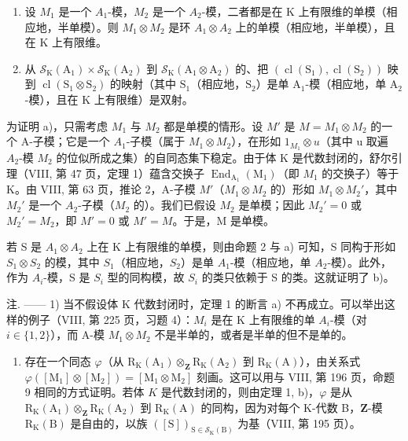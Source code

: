 \begin{enumerate}
\def\labelenumi{\alph{enumi})}
\item
  设 \(M_{1}\) 是一个 \(A_{1}\)-模，\(M_{2}\) 是一个 \(A_{2}\)-模，二者都是在 K 上有限维的单模（相应地，半单模）。则 \(M_{1} \otimes M_{2}\) 是环 \(A_{1} \otimes A_{2}\) 上的单模（相应地，半单模），且在 K 上有限维。
\item
  从 \(\mathcal{S}_{\mathrm{K}}(\mathrm{A}_1)\times \mathcal{S}_{\mathrm{K}}(\mathrm{A}_2)\) 到 \(\mathcal{S}_{\mathrm{K}}(\mathrm{A}_1\otimes \mathrm{A}_2)\) 的、把 \((\operatorname {cl}(\mathrm{S}_1),\operatorname {cl}(\mathrm{S}_2))\) 映到 \(\operatorname {cl}(\mathrm{S}_1\otimes \mathrm{S}_2)\) 的映射（其中 \(\mathrm{S}_1\)（相应地，\(\mathrm{S}_2\)）是单 \(\mathrm{A}_1\)-模（相应地，单 \(\mathrm{A}_2\)-模），且在 \(\mathrm{K}\) 上有限维）是双射。
\end{enumerate}

为证明 a)，只需考虑 \(M_{1}\) 与 \(M_{2}\) 都是单模的情形。设 \(M'\) 是 \(M = M_{1} \otimes M_{2}\) 的一个 A-子模；它是一个 \(A_{1}\)-子模（属于 \(M_{1} \otimes M_{2}\)），在形如 \(1_{M_{1}} \otimes u\)（其中 u 取遍 \(A_{2}\)-模 \(M_{2}\) 的位似所成之集）的自同态集下稳定。由于体 K 是代数封闭的，舒尔引理（VIII, 第 47 页，定理 1）蕴含交换子 \(\operatorname{End}_{\mathrm{A}_{1}}(\mathrm{M}_{1})\)（即 \(M_{1}\) 的交换子）等于 K。由 VIII, 第 63 页，推论 2，A-子模 \(M'\)（\(M_{1} \otimes M_{2}\) 的）形如 \(M_{1} \otimes M_{2}'\)，其中 \(M_{2}'\) 是一个 \(A_{2}\)-子模（\(M_{2}\) 的）。我们已假设 \(M_{2}\) 是单模；因此 \(M_{2}' = 0\) 或 \(M_{2}' = M_{2}\)，即 \(M' = 0\) 或 \(M' = M\)。于是，M 是单模。

若 S 是 \(A_{1} \otimes A_{2}\) 上在 K 上有限维的单模，则由命题 2 与 a) 可知，S 同构于形如 \(S_{1} \otimes S_{2}\) 的模，其中 \(S_{1}\)（相应地，\(S_{2}\)）是单 \(A_{1}\)-模（相应地，单 \(A_{2}\)-模）。此外，作为 \(A_{i}\)-模，S 是 \(S_{i}\) 型的同构模，故 \(S_{i}\) 的类只依赖于 S 的类。这就证明了 b)。

注. —— 1) 当不假设体 K 代数封闭时，定理 1 的断言 a) 不再成立。可以举出这样的例子（VIII, 第 225 页，习题 4）：\(M_{i}\) 是在 K 上有限维的单 \(A_{i}\)-模（对 \(i \in \{1, 2\}\)），而 A-模 \(M_{1} \otimes M_{2}\) 不是半单的，或者是半单的但不是单的。

\begin{enumerate}
\def\labelenumi{\arabic{enumi})}
\setcounter{enumi}{1}
\tightlist
\item
  存在一个同态 \(\varphi\)（从 \(\mathrm{R_K(A_1)\otimes_{\mathbf{Z}} R_K(A_2)}\) 到 \(\mathrm{R_K(A)}\)），由关系式 \(\varphi ([\mathrm{M}_1]\otimes [\mathrm{M}_2]) = [\mathrm{M}_1\otimes \mathrm{M}_2]\) 刻画。这可以用与 VIII, 第 196 页，命题 9 相同的方式证明。若体 \(K\) 是代数封闭的，则由定理 1, b)，\(\varphi\) 是从 \(\mathrm{R_K(A_1)\otimes_{\mathbf{Z}} R_K(A_2)}\) 到 \(\mathrm{R_K(A)}\) 的同构，因为对每个 K-代数 B，\(\mathbf{Z}\)-模 \(\mathrm{R_K(B)}\) 是自由的，以族 \(([\mathrm{S}])_{\mathrm{S}\in \mathcal{S}_{\mathrm{K}}(\mathrm{B})}\) 为基（VIII, 第 195 页）。
\end{enumerate}

